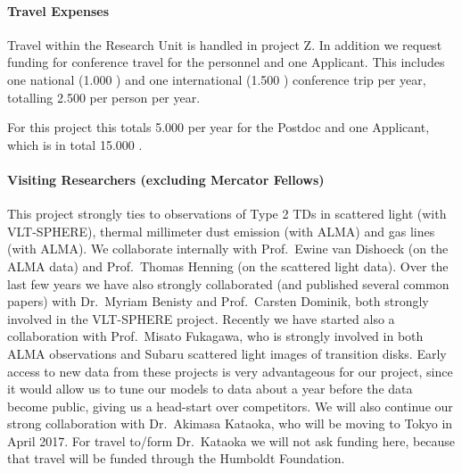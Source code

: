 \documentclass[10pt,fleqn,twoside]{article}
\begin{document}
\paragraph{Travel Expenses}

Travel within the Research Unit is handled in project Z. In addition we
request funding for conference travel for the personnel and one Applicant.
This includes one national (1.000 \EUR{}) and one international (1.500 \EUR{})
conference trip per year, totalling 2.500 \EUR{} per person per year. 

For this project this totals 5.000 \EUR{} per year for the Postdoc
and one Applicant, which is in total 15.000 \EUR{}.


\paragraph{Visiting Researchers (excluding Mercator Fellows)}
This project strongly ties to observations of Type 2 TDs in scattered light
(with VLT-SPHERE), thermal millimeter dust emission (with ALMA) and gas
lines (with ALMA). We collaborate internally with Prof.~Ewine van Dishoeck
(on the ALMA data) and Prof.~Thomas Henning (on the scattered light data).
Over the last few years we have also strongly collaborated (and published
several common papers) with Dr.~Myriam Benisty and Prof.~Carsten Dominik,
both strongly involved in the VLT-SPHERE project. Recently we have started
also a collaboration with Prof.~Misato Fukagawa, who is strongly involved in
both ALMA observations and Subaru scattered light images of transition
disks. Early access to new data from these projects is very advantageous for
our project, since it would allow us to tune our models to data about a year
before the data become public, giving us a head-start over competitors.  We
will also continue our strong collaboration with Dr.~Akimasa Kataoka, who
will be moving to Tokyo in April 2017. For travel to/form Dr.~Kataoka we
will not ask funding here, because that travel will be funded through the
Humboldt Foundation.
\end{document}

